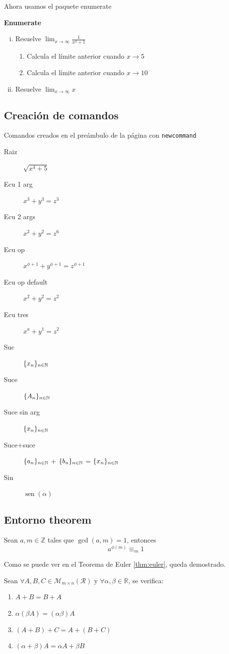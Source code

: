 \documentclass[10pt,a4paper]{article}
\newcommand{\raiz}{\ensuremath{\sqrt{x^4+5}}}
\newcommand{\ecu}[1]{\ensuremath{x^{#1}+y^{#1}=z^{#1}}}
\newcommand{\ecudos}[2]{\ensuremath{x^{#1}+y^{#1}=z^{#2}}}
\newcommand{\ecuop}[1][2]{\ensuremath{x^{#1}+y^{#1}=z^{#1}}}
\newcommand{\ecutres}[3][a]{\ensuremath{x^{#1}+y^{#2}=z^{#3}}}
\newcommand{\suc}{\ensuremath{\mathcal\{x_n\}_{n\in \mathbb{N}}}}
\newcommand{\suce}[1][x]{\ensuremath{\mathcal\{#1_n\}_{n\in \mathbb{N}}}}
\renewcommand{\sin}{\operatorname{sen}}
\begin{document}
Ahora usamos el paquete enumerate

\textbf{Enumerate}
\begin{enumerate}[i).-]
	\item Resuelve $\lim_{x\to \infty}\frac{1}{x^2+1}$
	\begin{enumerate}[1;]
		\item Calcula el límite anterior cuando $x\to 5$
		\item Calcula el límite anterior cuando $x\to 10$
	\end{enumerate} 
	\item Resuelve $\lim_{x\to \infty} x$
\end{enumerate}

\subsection{Creación de comandos}

Comandos creados en el preámbulo de la página con \verb*|newcommand|

\begin{description}
	\item[Raiz] \raiz
	\item[Ecu 1 arg] \ecu{3}
	\item[Ecu 2 args] \ecudos{2}{6}
	\item[Ecu op] \ecuop[\phi+1]
	\item[Ecu op default] \ecuop
	\item[Ecu tres] \ecutres{1}{2}
	\item[Suc] \suc
	\item[Suce] \suce[A]
	\item[Suce sin arg] \suce
	\item[Suce+suce] \suce[a] + \suce[b] = \suce
	\item[Sin] $\sin(\alpha)$
\end{description}

\subsection{Entorno theorem}

\begin{teorema}[Euler] \label{thm:euler}
	Sean $a,m\in \mathbb{Z}$ tales que $\gcd(a, m)=1$, entonces \[a^{\phi(m)}\equiv_m1\]
\end{teorema}

Como se puede ver en el Teorema de Euler \ref{thm:euler}, queda demostrado.

\begin{teorema}
	Sean $\forall A, B, C\in \mathcal{M}_{m\times n}(\mathcal{R})$ y $\forall \alpha, \beta\in \mathbb{R}$, se verifica:
	\begin{multicols}{2}
		\begin{enumerate} 
			\item $A+B=B+A$
			\item $\alpha(\beta A)=(\alpha \beta)A$
			\item $(A+B)+C=A+(B+C)$
			\item $(\alpha+\beta)A=\alpha A + \beta B$
		\end{enumerate}
	\end{multicols}
\end{teorema}
\end{document}
